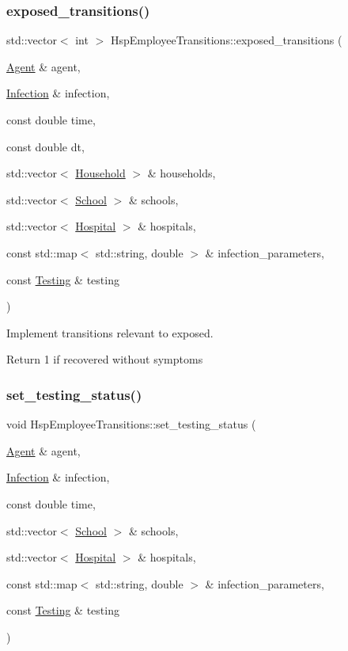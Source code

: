 \subsubsection{\texorpdfstring{exposed\+\_\+transitions()}{exposed\_transitions()}}
{\footnotesize\ttfamily std\+::vector$<$ int $>$ Hsp\+Employee\+Transitions\+::exposed\+\_\+transitions (\begin{DoxyParamCaption}\item[{\hyperlink{classAgent}{Agent} \&}]{agent,  }\item[{\hyperlink{classInfection}{Infection} \&}]{infection,  }\item[{const double}]{time,  }\item[{const double}]{dt,  }\item[{std\+::vector$<$ \hyperlink{classHousehold}{Household} $>$ \&}]{households,  }\item[{std\+::vector$<$ \hyperlink{classSchool}{School} $>$ \&}]{schools,  }\item[{std\+::vector$<$ \hyperlink{classHospital}{Hospital} $>$ \&}]{hospitals,  }\item[{const std\+::map$<$ std\+::string, double $>$ \&}]{infection\+\_\+parameters,  }\item[{const \hyperlink{classTesting}{Testing} \&}]{testing }\end{DoxyParamCaption})}



Implement transitions relevant to exposed. 

Return 1 if recovered without symptoms \mbox{\label{classHspEmployeeTransitions_a26f775b16217102ab60ccc8f32218f15}} 
\subsubsection{\texorpdfstring{set\+\_\+testing\+\_\+status()}{set\_testing\_status()}}
{\footnotesize\ttfamily void Hsp\+Employee\+Transitions\+::set\+\_\+testing\+\_\+status (\begin{DoxyParamCaption}\item[{\hyperlink{classAgent}{Agent} \&}]{agent,  }\item[{\hyperlink{classInfection}{Infection} \&}]{infection,  }\item[{const double}]{time,  }\item[{std\+::vector$<$ \hyperlink{classSchool}{School} $>$ \&}]{schools,  }\item[{std\+::vector$<$ \hyperlink{classHospital}{Hospital} $>$ \&}]{hospitals,  }\item[{const std\+::map$<$ std\+::string, double $>$ \&}]{infection\+\_\+parameters,  }\item[{const \hyperlink{classTesting}{Testing} \&}]{testing }\end{DoxyParamCaption})}



